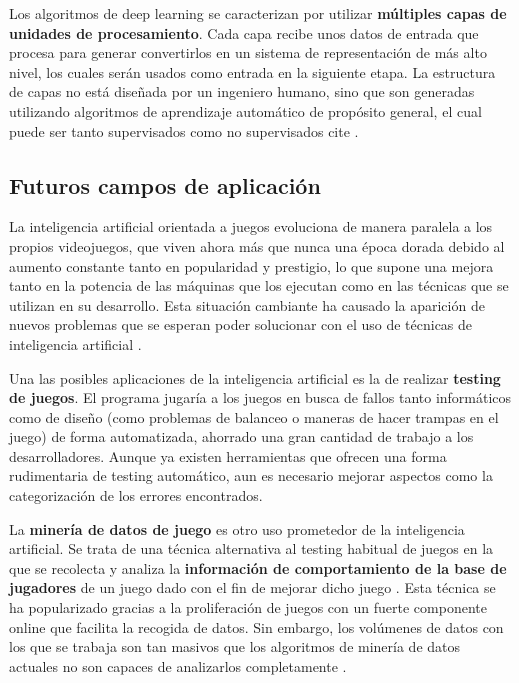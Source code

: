 Los algoritmos de deep learning se caracterizan por utilizar \textbf{múltiples capas de unidades de procesamiento}. Cada capa recibe unos datos de entrada que procesa para generar convertirlos en un sistema de representación de más alto nivel, los cuales serán usados como entrada en la siguiente etapa. La estructura de capas no está diseñada por un ingeniero humano, sino que son generadas utilizando algoritmos de aprendizaje automático de propósito general, el cual puede ser tanto supervisados como no supervisados cite \cite{deep_learning}. 

\subsection{Futuros campos de aplicación}
La inteligencia artificial orientada a juegos evoluciona de manera paralela a los propios videojuegos, que viven ahora más que nunca una época dorada debido al aumento constante tanto en popularidad y prestigio, lo que supone una mejora tanto en la potencia de las máquinas que los ejecutan como en las técnicas que se utilizan en su desarrollo. Esta situación cambiante ha causado la aparición de nuevos problemas que se esperan poder solucionar con el uso de técnicas de inteligencia artificial \cite{ai_and_games}.

Una las posibles aplicaciones de la inteligencia artificial es la de realizar \textbf{testing de juegos}. El programa jugaría a los juegos en busca de fallos tanto informáticos como de diseño (como problemas de balanceo o maneras de hacer trampas en el juego) de forma automatizada, ahorrado una gran cantidad de trabajo a los desarrolladores. Aunque ya existen herramientas que ofrecen una forma rudimentaria de testing automático, aun es necesario mejorar aspectos como la categorización de los errores encontrados.

La \textbf{minería de datos de juego} es otro uso prometedor de la inteligencia artificial. Se trata de una técnica alternativa al testing habitual de juegos en la que se recolecta y analiza la \textbf{información de comportamiento de la base de jugadores} de un juego dado con el fin de mejorar dicho juego \cite{ai_revisited}. Esta técnica se ha popularizado gracias a la proliferación de juegos con un fuerte componente online que facilita la recogida de datos. Sin embargo, los volúmenes de datos con los que se trabaja son tan masivos que los algoritmos de minería de datos actuales no son capaces de analizarlos completamente \cite{ai_revisited}.

